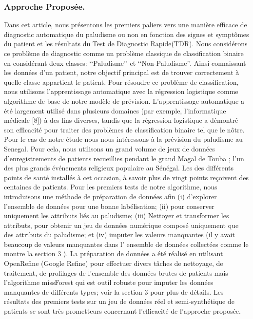 \subsubsection{Approche Proposée.}
Dans cet article, nous présentons les premiers paliers vers une manière efficace de diagnostic automatique du paludisme ou non en fonction des signes et symptômes du patient et les résultats du Test de Diagnostic Rapide(TDR). Nous considérons ce problème de diagnostic comme un problème classique de classification binaire en considérant deux classes: ‘‘Paludisme’’ et ‘‘Non-Paludisme’’. Ainsi connaissant les données d'un patient, notre objectif principal est de trouver correctement à quelle classe appartient le patient. Pour résoudre ce problème de classification, nous utilisons l’apprentissage automatique avec la  régression logistique comme algorithme de base de notre modèle  de prévision. L'apprentissage automatique a été largement utilisé dans plusieurs domaines (par exemple, l'informatique médicale [8]) à des fins diverses, tandis que la régression logistique a démontré son efficacité pour traiter des problèmes de classification binaire tel que le nôtre. Pour le cas de notre étude nous nous intéressons à la prévision du paludisme au Senegal. Pour cela, nous utilisons un grand volume de jeux de données d’enregistrements de patients recueillies pendant le grand Magal de Touba ; l’un des plus grands événements religieux populaire au Sénégal.  Les des différents points de santé installés à cet occasion, à savoir plus de vingt points  reçoivent des centaines de patients. Pour les premiers tests de notre algorithme, nous introduisons une méthode  de préparation de données afin (i) d’explorer l'ensemble de données pour une bonne labélisation; (ii) pour  conserver uniquement les attributs liés au paludisme; (iii) Nettoyer  et transformer les attributs, pour obtenir un jeu de données  numérique composé uniquement que des attributs du paludisme; et (iv) imputer les valeurs manquantes (il y avait beaucoup de valeurs manquantes dans l’ ensemble de données collectées comme le montre la section 3 ). 
La préparation de données a été réalisé en utilisant OpenRefine (Google Refine) pour effectuer divers tâches de nettoyage, de traitement, de profilages de l’ensemble des données brutes de patients mais l’algorithme  missForest qui est outil robuste pour imputer les données manquantes de différents types; voir la section 3 pour plus de détails. Les résultats des premiers tests sur un jeu de données  réel et semi-synthétique de patients se sont très prometteurs concernant l’efficacité de l’approche proposée.
